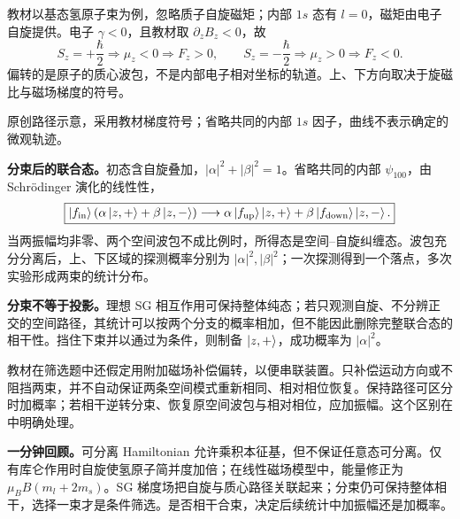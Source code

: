 教材以基态氢原子束为例，忽略质子自旋磁矩；内部 $1s$ 态有 $l=0$，磁矩由电子自旋提供。电子 $\gamma<0$，且教材取 $\partial_zB_z<0$，故
\begin{equation}
  S_z=+\frac\hbar2\Rightarrow\mu_z<0\Rightarrow F_z>0,
  \qquad
  S_z=-\frac\hbar2\Rightarrow\mu_z>0\Rightarrow F_z<0.
\end{equation}
偏转的是原子的质心波包，不是内部电子相对坐标的轨道。上、下方向取决于旋磁比与磁场梯度的符号。

\begin{center}

{\small 原创路径示意，采用教材梯度符号；省略共同的内部 $1s$ 因子，曲线不表示确定的微观轨迹。}
\end{center}

\textbf{分束后的联合态。}初态含自旋叠加，$|\alpha|^2+|\beta|^2=1$。省略共同的内部 $\psi_{100}$，由 Schrödinger 演化的线性性，
\begin{equation}
  \boxed{\left|f_{\rm in}\right\rangle(\alpha\left|z,+\right\rangle+\beta\left|z,-\right\rangle)
  \longrightarrow
  \alpha\left|f_{\rm up}\right\rangle\left|z,+\right\rangle
  +\beta\left|f_{\rm down}\right\rangle\left|z,-\right\rangle.}
\end{equation}
当两振幅均非零、两个空间波包不成比例时，所得态是空间--自旋纠缠态。波包充分分离后，上、下区域的探测概率分别为 $|\alpha|^2,|\beta|^2$；一次探测得到一个落点，多次实验形成两束的统计分布。

\textbf{分束不等于投影。}理想 SG 相互作用可保持整体纯态；若只观测自旋、不分辨正交的空间路径，其统计可以按两个分支的概率相加，但不能因此删除完整联合态的相干性。挡住下束并以通过为条件，则制备 $\left|z,+\right\rangle$，成功概率为 $|\alpha|^2$。

教材在筛选题中还假定用附加磁场补偿偏转，以便串联装置。只补偿运动方向或不阻挡两束，并不自动保证两条空间模式重新相同、相对相位恢复。保持路径可区分时加概率；若相干逆转分束、恢复原空间波包与相对相位，应加振幅。这个区别在中明确处理。

\textbf{一分钟回顾。}可分离 Hamiltonian 允许乘积本征基，但不保证任意态可分离。仅有库仑作用时自旋使氢原子简并度加倍；在线性磁场模型中，能量修正为 $\mu_BB(m_l+2m_s)$。SG 梯度场把自旋与质心路径关联起来；分束仍可保持整体相干，选择一束才是条件筛选。是否相干合束，决定后续统计中加振幅还是加概率。
